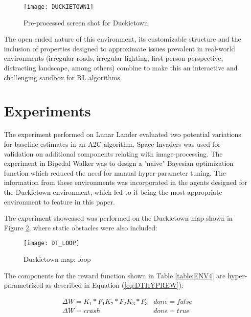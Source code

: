 \documentclass[journal]{IEEEtran}
\begin{document}
		\begin{figure}[ht]
			\hfill\texttt{[image: DUCKIETOWN1]}\hspace*{\fill}
			\caption{Pre-processed screen shot for Duckietown}
			\label{fig:ENV4.1}
		\end{figure}
		
		The open ended nature of this environment, its customizable structure and the inclusion of properties designed to approximate issues prevalent in real-world environments (irregular roads, irregular lighting, first person perspective, distracting landscape, among others) combine to make this an interactive and challenging sandbox for RL algorithms.

\section{Experiments}

	The experiment performed on Lunar Lander evaluated two potential variations for baseline estimates in an A2C algorithm. Space Invaders was used for validation on additional components relating with image-processing. The experiment in Bipedal Walker was to design a "naive" Bayesian optimization function \cite{snoek2012practical} which reduced the need for manual hyper-parameter tuning. The information from these environments was incorporated in the agents designed for the Duckietown environment, which led to it being the most appropriate environment to feature in this paper. 

	 The experiment showcased was performed on the Duckietown map shown in Figure \ref{fig:DTLOOP}, where static obstacles were also included:

	\begin{figure}[hbt!]
		\centering
		
		\texttt{[image: DT\_LOOP]}
		\caption{Duckietown map: loop}
  		\label{fig:DTLOOP}
	\end{figure}
	
	The components for the reward function shown in Table \ref{table:ENV4} are hyper-parametrized as described in Equation (\ref{eq:DTHYPREW}):
		
	\begin{equation} \label{eq:DTHYPREW}
		\begin{array}{ll}
			
			\Delta W = K_1 * F_1 K_2 * F_2 K_3 * F_3 & done=false \\
			\Delta W = crash & done=true \\
				
		\end{array}
	\end{equation}
	
\end{document}
